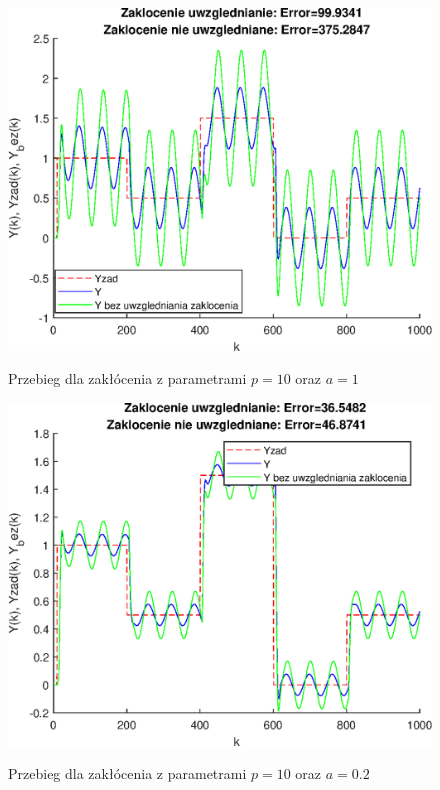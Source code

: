 \begin{figure}[h!]
	\centering
	\includegraphics[scale=1]{Rys/sin10_1}
	\label{fig:sin10_1}
	\caption{Przebieg dla zakłócenia z parametrami $p=10$ oraz $a=1$}
\end{figure}
\begin{figure}[h!]
	\centering
	\includegraphics[scale=1]{Rys/sin10_5}
	\label{fig:sin10_5}
	\caption{Przebieg dla zakłócenia z parametrami $p=10$ oraz $a=0.2$}
\end{figure}
